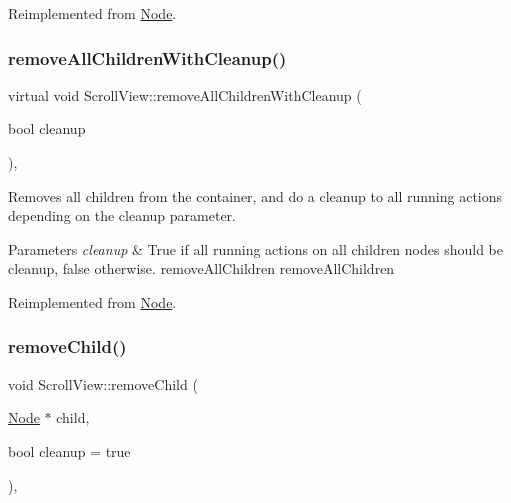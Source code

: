 Reimplemented from \hyperlink{classNode_aca66e2b385c3dbf1a6f55627c4a13192}{Node}.

\mbox{\label{classScrollView_a8b2cfd556bae69ffbd5ae3d5813d53e5}} 
\subsubsection{\texorpdfstring{remove\+All\+Children\+With\+Cleanup()}{removeAllChildrenWithCleanup()}\hspace{0.1cm}{\footnotesize\ttfamily [2/2]}}
{\footnotesize\ttfamily virtual void Scroll\+View\+::remove\+All\+Children\+With\+Cleanup (\begin{DoxyParamCaption}\item[{bool}]{cleanup }\end{DoxyParamCaption})\hspace{0.3cm}{\ttfamily [override]}, {\ttfamily [virtual]}}

Removes all children from the container, and do a cleanup to all running actions depending on the cleanup parameter.


\begin{DoxyParams}{Parameters}
{\em cleanup} & True if all running actions on all children nodes should be cleanup, false otherwise.  remove\+All\+Children  remove\+All\+Children \\
\hline
\end{DoxyParams}


Reimplemented from \hyperlink{classNode_aca66e2b385c3dbf1a6f55627c4a13192}{Node}.

\mbox{\label{classScrollView_a678108e716966e8beccc25c0de1d9b29}} 
\subsubsection{\texorpdfstring{remove\+Child()}{removeChild()}\hspace{0.1cm}{\footnotesize\ttfamily [1/2]}}
{\footnotesize\ttfamily void Scroll\+View\+::remove\+Child (\begin{DoxyParamCaption}\item[{\hyperlink{classNode}{Node} $\ast$}]{child,  }\item[{bool}]{cleanup = {\ttfamily true} }\end{DoxyParamCaption})\hspace{0.3cm}{\ttfamily [override]}, {\ttfamily [virtual]}}

